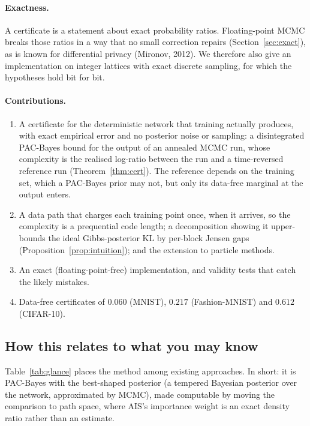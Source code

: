 \documentclass[11pt]{article}
\theoremstyle{definition}
\theoremstyle{remark}
\begin{document}
\paragraph{Exactness.} A certificate is a statement about exact probability ratios. Floating-point MCMC breaks those
ratios in a way that no small correction repairs (Section~\ref{sec:exact}), as is known for differential privacy
(Mironov, 2012). We therefore also give an implementation on integer lattices with exact discrete sampling, for which the
hypotheses hold bit for bit.

\paragraph{Contributions.}
\begin{enumerate}[nosep]
\item A certificate for the deterministic network that training actually produces, with exact empirical error and no
  posterior noise or sampling: a disintegrated PAC-Bayes bound for the output of an annealed MCMC run, whose complexity is
  the realised log-ratio between the run and a time-reversed reference run (Theorem~\ref{thm:cert}). The reference depends on the
  training set, which a PAC-Bayes prior may not, but only its data-free marginal at the output enters.
\item A data path that charges each training point once, when it arrives, so the complexity is a prequential code
  length; a decomposition showing it upper-bounds the ideal Gibbs-posterior KL by per-block Jensen gaps
  (Proposition~\ref{prop:intuition}); and the extension to particle methods.
\item An exact (floating-point-free) implementation, and validity tests that catch the likely mistakes.
\item Data-free certificates of $0.060$ (MNIST), $0.217$ (Fashion-MNIST) and $0.612$ (CIFAR-10).
\end{enumerate}

\subsection{How this relates to what you may know}\label{sec:glance}
Table~\ref{tab:glance} places the method among existing approaches. In short: it is PAC-Bayes with the best-shaped
posterior (a tempered Bayesian posterior over the network, approximated by MCMC), made computable by moving the
comparison to path space, where AIS's importance weight is an exact density ratio rather than an estimate.
\end{document}
